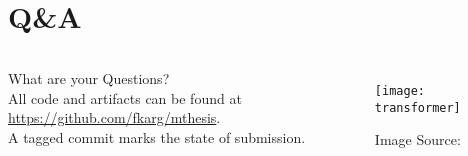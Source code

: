 \section{Q\&A}

\begin{frame}[c]
    \Huge
    \begin{columns}
        \begin{centering}
            \vfill
            \vspace{1em}
            What are your Questions? \\
            \large
            \vspace{3em}
            All code and artifacts can be found at \url{https://github.com/fkarg/mthesis}. \\
            A tagged commit marks the state of submission.
            \vfill
        \end{centering}
        \begin{figure}
        \texttt{[image: transformer]}
        \caption{
            Image Source: \cite{vaswani_attention_2017}
        }
    \end{figure}
    \end{columns}
\end{frame}
